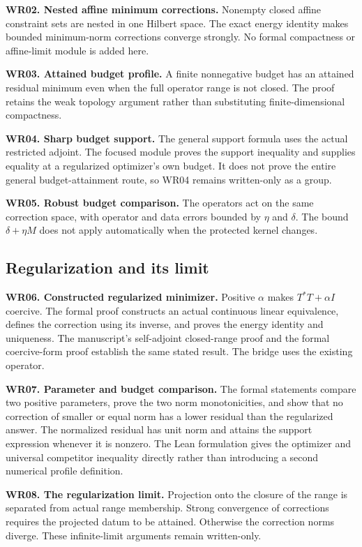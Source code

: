 \textbf{WR02. Nested affine minimum corrections.} Nonempty closed affine constraint sets are nested in one Hilbert space. The exact energy identity makes bounded minimum-norm corrections converge strongly. No formal compactness or affine-limit module is added here.

\textbf{WR03. Attained budget profile.} A finite nonnegative budget has an attained residual minimum even when the full operator range is not closed. The proof retains the weak topology argument rather than substituting finite-dimensional compactness.

\textbf{WR04. Sharp budget support.} The general support formula uses the actual restricted adjoint. The focused module proves the support inequality and supplies equality at a regularized optimizer's own budget. It does not prove the entire general budget-attainment route, so WR04 remains written-only as a group.

\textbf{WR05. Robust budget comparison.} The operators act on the same correction space, with operator and data errors bounded by $\eta$ and $\delta$. The bound $\delta+\eta M$ does not apply automatically when the protected kernel changes.

\subsection{Regularization and its limit}
\textbf{WR06. Constructed regularized minimizer.} Positive $\alpha$ makes $T^*T+\alpha I$ coercive. The formal proof constructs an actual continuous linear equivalence, defines the correction using its inverse, and proves the energy identity and uniqueness. The manuscript's self-adjoint closed-range proof and the formal coercive-form proof establish the same stated result. The bridge uses the existing  operator.

\textbf{WR07. Parameter and budget comparison.} The formal statements compare two positive parameters, prove the two norm monotonicities, and show that no correction of smaller or equal norm has a lower residual than the regularized answer. The normalized residual has unit norm and attains the support expression whenever it is nonzero. The Lean formulation gives the optimizer and universal competitor inequality directly rather than introducing a second numerical profile definition.

\textbf{WR08. The regularization limit.} Projection onto the closure of the range is separated from actual range membership. Strong convergence of corrections requires the projected datum to be attained. Otherwise the correction norms diverge. These infinite-limit arguments remain written-only.

